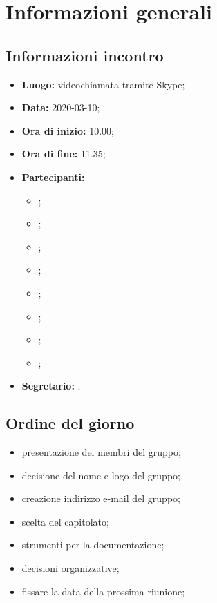 \section{Informazioni generali}
\subsection{Informazioni incontro}
\begin{itemize}
	\item \textbf{Luogo:} videochiamata tramite Skype; 
	\item \textbf{Data:} 2020-03-10; 
	\item \textbf{Ora di inizio:} 10.00; 
	\item \textbf{Ora di fine:} 11.35; 
	\item \textbf{Partecipanti:}
		\begin{itemize}
			\item \VB; 
			\item \LB; 
			\item \NF; 
			\item \EG; 
			\item \FJ; 
			\item \MP; 
			\item \AS; 
			\item \AZ; 
		\end{itemize}
	\item \textbf{Segretario:} \EG. 
\end{itemize}

\subsection{Ordine del giorno}
\begin{itemize}
	\item presentazione dei membri del gruppo;
	\item decisione del nome e logo del gruppo; 
	\item creazione indirizzo e-mail del gruppo;
	\item scelta del capitolato;
	\item strumenti per la documentazione;
	\item decisioni organizzative;
	\item fissare la data della prossima riunione;
\end{itemize}
